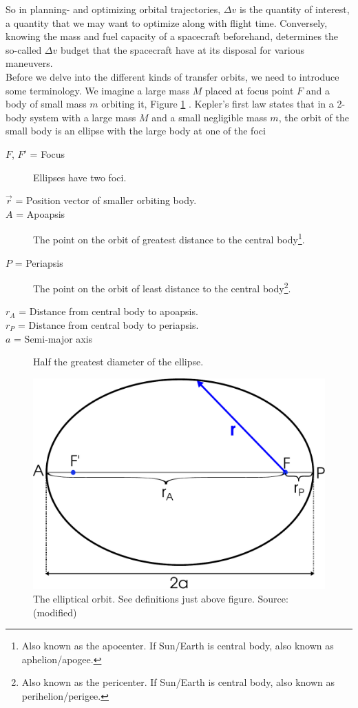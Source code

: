 So in planning- and optimizing orbital trajectories, $\Delta v$ is the quantity of interest, a quantity that we may want to optimize along with flight time. Conversely, knowing the mass and fuel capacity of a spacecraft beforehand, determines the so-called $\Delta v$ budget that the spacecraft have at its disposal for various maneuvers.
\\
Before we delve into the different kinds of transfer orbits, we need to introduce some terminology. We imagine a large mass $M$ placed at focus point $F$ and a body of small mass $m$ orbiting it, Figure \ref{fig:ellipse} \cite{Murray1999}. Kepler's first law states that in a 2-body system with a large mass $M$ and a small negligible mass $m$, the orbit of the small body is an ellipse with the large body at one of the foci \cite{Knudsen2002}
\begin{description}
    \item[$F$, $F'$ = Focus] Ellipses have two foci.
    \item[$\vec{r}$ = Position vector of smaller orbiting body.]
    \item[$A$ = Apoapsis] The point on the orbit of greatest distance to the central body\footnote{Also known as the apocenter. If Sun/Earth is central body, also known as aphelion/apogee.}.
    \item[$P$ = Periapsis] The point on the orbit of least distance to the central body\footnote{Also known as the pericenter. If Sun/Earth is central body, also known as perihelion/perigee.}.
    \item[$r_A$ = Distance from central body to apoapsis.]
    \item[$r_P$ = Distance from central body to periapsis.]
    \item[$a$ = Semi-major axis] Half the greatest diameter of the ellipse.
\end{description}

\begin{figure}[ht!]
\centering
\includegraphics[scale=0.51]{fig/ellipse.pdf}
\caption{The elliptical orbit. See definitions just above figure. Source: \cite{fig-ellipse} (modified)}
\label{fig:ellipse}
\end{figure}


